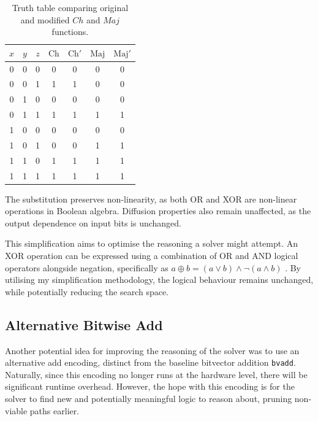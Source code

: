 \documentclass[a4paper]{report}
\begin{document}
\begin{table}[H]
\centering
\caption{Truth table comparing original and modified $Ch$ and $Maj$ functions.}
\label{tab:truth-table}
\begin{tabular}{ccc|cc|cc}
\(x\) & \(y\) & \(z\) & \(\textrm{Ch}\) & \(\textrm{Ch}'\) & \(\textrm{Maj}\) & \(\textrm{Maj}'\) \\ \hline
0 & 0 & 0 & 0 & 0 & 0 & 0 \\
0 & 0 & 1 & 1 & 1 & 0 & 0 \\
0 & 1 & 0 & 0 & 0 & 0 & 0 \\
0 & 1 & 1 & 1 & 1 & 1 & 1 \\
1 & 0 & 0 & 0 & 0 & 0 & 0 \\
1 & 0 & 1 & 0 & 0 & 1 & 1 \\
1 & 1 & 0 & 1 & 1 & 1 & 1 \\
1 & 1 & 1 & 1 & 1 & 1 & 1 \\
\end{tabular}
\end{table}

The substitution preserves non-linearity, as both OR and XOR are non-linear operations in Boolean algebra.
Diffusion properties also remain unaffected, as the output dependence on input bits is unchanged.

This simplification aims to optimise the reasoning a solver might attempt.
An XOR operation can be expressed using a combination of OR and AND logical operators alongside negation, specifically as $a \oplus b = (a \lor b) \land \lnot (a \land b)$ \cite{wiki:xor}.
By utilising my simplification methodology, the logical behaviour remains unchanged, while potentially reducing the search space.

\subsection{Alternative Bitwise Add}
\label{ssec:add-encoding}
Another potential idea for improving the reasoning of the solver was to use an alternative add encoding, distinct from the baseline bitvector addition \texttt{bvadd}.
Naturally, since this encoding no longer runs at the hardware level, there will be significant runtime overhead.
However, the hope with this encoding is for the solver to find new and potentially meaningful logic to reason about, pruning non-viable paths earlier.
\end{document}
